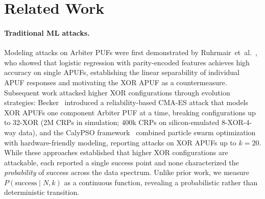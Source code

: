 \section{Related Work}
\label{sec:related_work}

\widefloatbegin
\centering
\caption{Comparison of representative modeling attack methods on XOR APUFs.
CRP budgets are approximate and reported at or near the transition midpoint.}
\label{tab:related_comparison}
\widefloatend

\paragraph{Traditional ML attacks.}
Modeling attacks on Arbiter PUFs were first demonstrated by
Ruhrmair~et~al.~\cite{ruhrmair2010modeling}, who showed that logistic regression
with parity-encoded features achieves high accuracy on single APUFs, establishing
the linear separability of individual APUF responses and motivating the XOR APUF
as a countermeasure.  Subsequent work attacked higher XOR configurations through
evolution strategies: Becker~\cite{becker2015cia} introduced a
reliability-based CMA-ES attack that models XOR APUFs one component Arbiter PUF
at a time, breaking configurations up to 32-XOR (2M CRPs in simulation; 400k
CRPs on silicon-emulated 8-XOR-4-way data), and the CalyPSO
framework~\cite{calypso2024} combined particle swarm optimization with
hardware-friendly modeling, reporting attacks on XOR APUFs up to $k=20$.  While
these approaches established that higher XOR configurations are attackable, each
reported a single success point and none characterized the \emph{probability} of
success across the data spectrum.  Unlike prior work, we measure
$P(\text{success} \mid N, k)$ as a continuous function, revealing a probabilistic
rather than deterministic transition.

